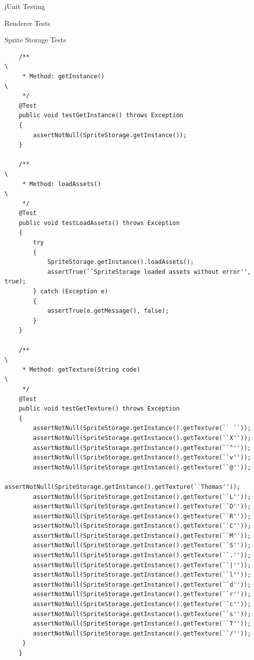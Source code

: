 \documentclass[12pt]{report}
\begin{document}
\begin{chapter}{jUnit Testing}
\begin{section}{Renderer Tests}
\begin{subsection}{Sprite Storage Tests}
\begin{lstlisting}
    /**                                                                                  \
     * Method: getInstance()                                                             \
     */
    @Test
    public void testGetInstance() throws Exception
    {
        assertNotNull(SpriteStorage.getInstance());
    }

    /**                                                                                  \
     * Method: loadAssets()                                                              \
     */
    @Test
    public void testLoadAssets() throws Exception
    {
        try
        {
            SpriteStorage.getInstance().loadAssets();
            assertTrue(``SpriteStorage loaded assets without error'', true);
        } catch (Exception e)
        {
            assertTrue(e.getMessage(), false);
        }
    }

    /**                                                                                  \  
     * Method: getTexture(String code)                                                   \
     */
    @Test
    public void testGetTexture() throws Exception
    {
        assertNotNull(SpriteStorage.getInstance().getTexture(`` ``));                     
        assertNotNull(SpriteStorage.getInstance().getTexture(``X''));
        assertNotNull(SpriteStorage.getInstance().getTexture(``^''));
        assertNotNull(SpriteStorage.getInstance().getTexture(``v''));
        assertNotNull(SpriteStorage.getInstance().getTexture(``@''));
        assertNotNull(SpriteStorage.getInstance().getTexture(``Thomas''));
        assertNotNull(SpriteStorage.getInstance().getTexture(``L''));
        assertNotNull(SpriteStorage.getInstance().getTexture(``D''));
        assertNotNull(SpriteStorage.getInstance().getTexture(``R''));
        assertNotNull(SpriteStorage.getInstance().getTexture(``C''));
        assertNotNull(SpriteStorage.getInstance().getTexture(``M''));
        assertNotNull(SpriteStorage.getInstance().getTexture(``S''));
        assertNotNull(SpriteStorage.getInstance().getTexture(``.''));
        assertNotNull(SpriteStorage.getInstance().getTexture(``|''));
        assertNotNull(SpriteStorage.getInstance().getTexture(``l''));
        assertNotNull(SpriteStorage.getInstance().getTexture(``d''));
        assertNotNull(SpriteStorage.getInstance().getTexture(``r''));
        assertNotNull(SpriteStorage.getInstance().getTexture(``c''));
        assertNotNull(SpriteStorage.getInstance().getTexture(``s''));
        assertNotNull(SpriteStorage.getInstance().getTexture(``T''));
        assertNotNull(SpriteStorage.getInstance().getTexture(``/''));
     }
    }

    \end{lstlisting}
   \end{subsection}
  \end{section}
 \end{chapter}
\end{document}

